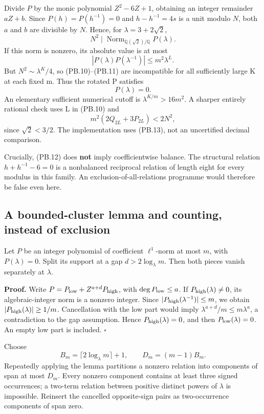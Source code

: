 Divide \(P\) by the monic polynomial \(Z^2-6Z+1\), obtaining an integer remainder \(aZ+b\). Since \(P(h)=P(h^{-1})=0\) and \(h-h^{-1}=4s\) is a unit modulo \(N\), both \(a\) and \(b\) are divisible by \(N\). Hence, for \(\lambda=3+2\sqrt2\), \[
 N^2\mid \operatorname{Norm}_{\mathbb Q(\sqrt2)/\mathbb Q}P(\lambda).
\] If this norm is nonzero, its absolute value is at most \[
 |P(\lambda)P(\lambda^{-1})|\leq m^2\lambda^L. \tag{PB.11}
\] But \(N^2\sim\lambda^K/4\), so (PB.10)--(PB.11) are incompatible for all sufficiently large K at each fixed m. Thus the rotated P satisfies \[
 P(\lambda)=0. \tag{PB.12}
\] An elementary sufficient numerical cutoff is \(\lambda^{K/m}>16m^2\). A sharper entirely rational check uses L in (PB.10) and \[
 m^2(2Q_{2L}+3P_{2L})<2N^2, \tag{PB.13}
\] since \(\sqrt2<3/2\). The implementation uses (PB.13), not an uncertified decimal comparison.

Crucially, (PB.12) does \textbf{not} imply coefficientwise balance. The structural relation \(h+h^{-1}-6=0\) is a nonbalanced reciprocal relation of length eight for every modulus in this family. An exclusion-of-all-relations programme would therefore be false even here.

\subsection{A bounded-cluster lemma and counting, instead of exclusion}\label{pell_blocks:a-bounded-cluster-lemma-and-counting-instead-of-exclusion}

\begin{lemma}\label{pass1:pell_blocks-2} Let \(P\) be an integer polynomial of coefficient \(\ell^1\)-norm at most \(m\), with \(P(\lambda)=0\). Split its support at a gap \(d>2\log_\lambda m\). Then both pieces vanish separately at \(\lambda\).
\end{lemma}

\textbf{Proof.} Write \(P=P_{\rm low}+Z^{a+d}P_{\rm high}\), with \(\deg P_{\rm low}\leq a\). If \(P_{\rm high}(\lambda)\ne0\), its algebraic-integer norm is a nonzero integer. Since \(|P_{\rm high}(\lambda^{-1})|\leq m\), we obtain \(|P_{\rm high}(\lambda)|\geq1/m\). Cancellation with the low part would imply \(\lambda^{a+d}/m\leq m\lambda^a\), a contradiction to the gap assumption. Hence \(P_{\rm high}(\lambda)=0\), and then \(P_{\rm low}(\lambda)=0\). An empty low part is included. \(\square\)

Choose \[
 B_m=\lceil2\log_\lambda m\rceil+1,\qquad D_m=(m-1)B_m.
\] Repeatedly applying the lemma partitions a nonzero relation into components of span at most \(D_m\). Every nonzero component contains at least three signed occurrences; a two-term relation between positive distinct powers of \(\lambda\) is impossible. Reinsert the cancelled opposite-sign pairs as two-occurrence components of span zero.

